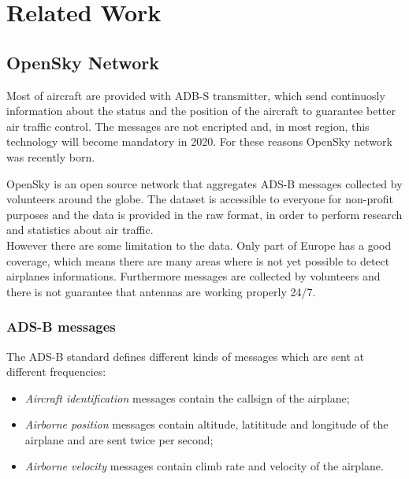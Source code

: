 \documentclass{vldb}
\begin{document}
\section{Related Work}

\subsection{OpenSky Network}

Most of aircraft are provided with ADB-S transmitter, which send continuosly
information about the status and the position of the aircraft to guarantee
better air traffic control. The messages are not encripted and, in most region,
this technology will become mandatory in 2020. For these reasons OpenSky network
was recently born\cite{opensky}.

OpenSky is an open source network that aggregates ADS-B messages collected by
volunteers around the globe. The dataset is accessible to everyone for
non-profit purposes and the data is provided in the raw format, in order to
perform research and statistics about air traffic. \\
However there are some limitation to the data. Only part of Europe has a good
coverage, which means there are many areas where is not yet possible to detect
airplanes informations. Furthermore messages are collected by volunteers and
there is not guarantee that antennas are working properly 24/7.

\subsubsection{ADS-B messages}

The ADS-B standard defines different kinds of messages which are sent at
different frequencies:

\begin{itemize}
  \item \textit{Aircraft identification} messages contain the callsign of the
  airplane;
  \item \textit{Airborne position} messages contain altitude, latititude and
  longitude of the airplane and are sent twice per second;
  \item \textit{Airborne velocity} messages contain climb rate and velocity of
  the airplane.
\end{itemize}
\end{document}
